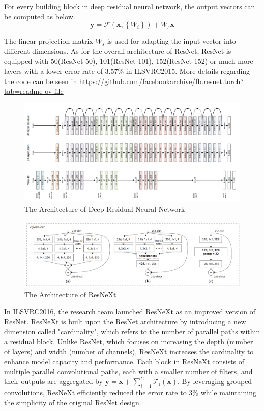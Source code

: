 \documentclass[a4paper]{article}
\begin{document}
For every building block in deep residual neural network, the output vectors can be computed as below.$$\mathbf{y}=\mathcal{F}\left(\mathbf{x},\left\{W_{i}\right\}\right)+W_{s} \mathbf{x}$$

The linear projection matrix $W_{s}$ is used for adapting the input vector into different dimensions. As for the overall architecture of ResNet, ResNet is equipped with 50(ResNet-50), 101(ResNet-101), 152(ResNet-152) or much more layers with a lower error rate of 3.57\% in ILSVRC2015. More details regarding the code can be seen in \url{https://github.com/facebookarchive/fb.resnet.torch?tab=readme-ov-file}

\begin{figure}[ht]
    \centering
    \includegraphics[width=\textwidth]{images/ResNet2.png}
    \caption{The Architecture of Deep Residual Neural Network\citep{DBLP:journals/corr/HeZRS15}}
\end{figure}

\begin{figure}[ht]
    \centering
    \includegraphics[width=\textwidth]{images/ResNeXt.png}
    \caption{The Architecture of ResNeXt\citep{DBLP:journals/corr/XieGDTH16}}
\end{figure}

In ILSVRC2016, the research team launched ResNeXt as an improved version of ResNet. ResNeXt is built upon the ResNet architecture by introducing a new dimension called "cardinality", which refers to the number of parallel paths within a residual block. Unlike ResNet, which focuses on increasing the depth (number of layers) and width (number of channels), ResNeXt increases the cardinality to enhance model capacity and performance. Each block in ResNeXt consists of multiple parallel convolutional paths, each with a smaller number of filters, and their outputs are aggregated by $\mathbf{y}=\mathbf{x}+\sum_{i=1}^{C} \mathcal{T}_{i}(\mathbf{x})$. By leveraging grouped convolutions, ResNeXt efficiently reduced the error rate to 3\% while maintaining the simplicity of the original ResNet design. 
\end{document}
